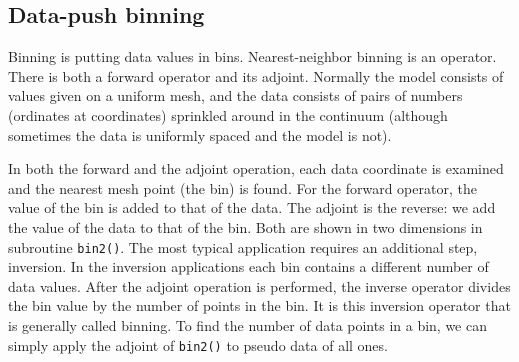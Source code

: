 \subsection{Data-push binning}
Binning is putting data values in bins.
Nearest-neighbor binning is an operator.
There is both a forward operator and its adjoint.
Normally the model consists of values given on a uniform mesh,
and the data consists of pairs of numbers (ordinates at coordinates)
sprinkled around in the continuum
(although sometimes the data is uniformly spaced and the model is not).
\par
In both the forward and the adjoint operation,
each data coordinate is examined
and the nearest mesh point (the bin) is found.
For the forward operator,
the value of the bin is added to that of the data.
The adjoint is the reverse:
we add the value of the data to that of the bin.
Both are shown in two dimensions in subroutine \texttt{bin2()}.
The most typical application requires an additional step, inversion.
In the inversion applications
each bin contains a different number of data values.
After the adjoint operation is performed,
the inverse operator divides the bin value
by the number of points in the bin.
It is this inversion operator that is generally called binning.
To find the number of data points in a bin,
we can simply apply the adjoint of \texttt{bin2()} to pseudo data of all ones.


